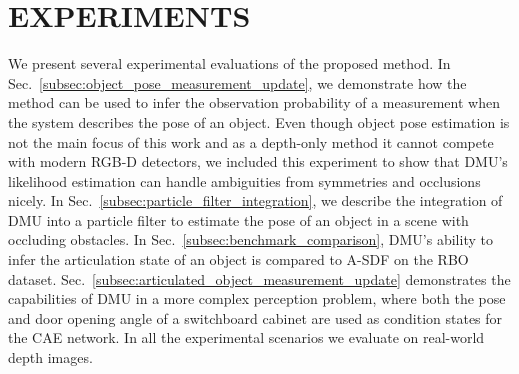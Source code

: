 \documentclass[letterpaper, 10 pt, journal, twoside]{ieeetran}  %
\begin{document}
\section{EXPERIMENTS}
\label{sec:experiments}
We present several experimental evaluations of the proposed method. In Sec.~\ref{subsec:object_pose_measurement_update}, we demonstrate how the method can be used to infer the observation probability of a measurement when the system describes the pose of an object.
Even though object pose estimation is not the main focus of this work and as a depth-only method it cannot compete with modern RGB-D detectors, we included this experiment to show that DMU's likelihood estimation can handle ambiguities from symmetries and occlusions nicely.
In Sec.~\ref{subsec:particle_filter_integration}, we describe the integration of DMU into a particle filter to estimate the pose of an object in a scene with occluding obstacles.
In Sec.~\ref{subsec:benchmark_comparison}, DMU's ability to infer the articulation state of an object is compared to A-SDF on the RBO dataset.
Sec.~\ref{subsec:articulated_object_measurement_update} demonstrates the capabilities of DMU in a more complex perception problem, where both the pose and door opening angle of a switchboard cabinet are used as condition states for the CAE network.
In all the experimental scenarios we evaluate on real-world depth images.%
\end{document}
